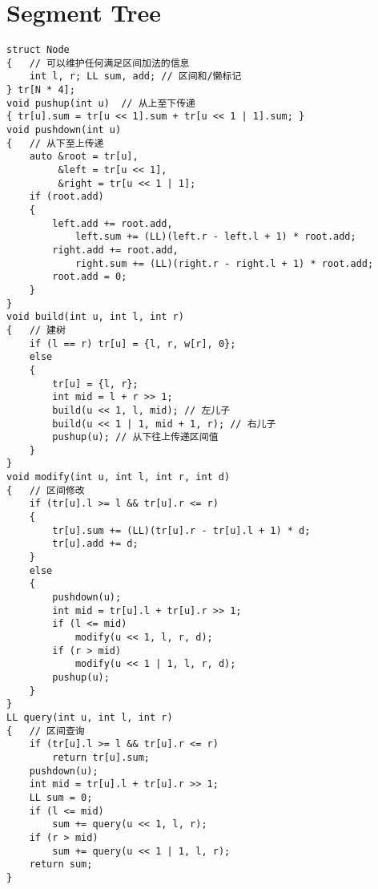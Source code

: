 \section{Segment Tree}
\begin{lstlisting}
struct Node
{   // 可以维护任何满足区间加法的信息
    int l, r; LL sum, add; // 区间和/懒标记
} tr[N * 4];
void pushup(int u)  // 从上至下传递
{ tr[u].sum = tr[u << 1].sum + tr[u << 1 | 1].sum; }
void pushdown(int u)
{   // 从下至上传递
    auto &root = tr[u],
         &left = tr[u << 1],
         &right = tr[u << 1 | 1];
    if (root.add)
    {
        left.add += root.add,
            left.sum += (LL)(left.r - left.l + 1) * root.add;
        right.add += root.add,
            right.sum += (LL)(right.r - right.l + 1) * root.add;
        root.add = 0;
    }
}
void build(int u, int l, int r)
{   // 建树
    if (l == r) tr[u] = {l, r, w[r], 0};
    else
    {
        tr[u] = {l, r};
        int mid = l + r >> 1;
        build(u << 1, l, mid); // 左儿子
        build(u << 1 | 1, mid + 1, r); // 右儿子
        pushup(u); // 从下往上传递区间值
    }
}
void modify(int u, int l, int r, int d)
{   // 区间修改
    if (tr[u].l >= l && tr[u].r <= r)
    {
        tr[u].sum += (LL)(tr[u].r - tr[u].l + 1) * d;
        tr[u].add += d;
    }
    else
    {
        pushdown(u);
        int mid = tr[u].l + tr[u].r >> 1;
        if (l <= mid)
            modify(u << 1, l, r, d);
        if (r > mid)
            modify(u << 1 | 1, l, r, d);
        pushup(u);
    }
}
LL query(int u, int l, int r)
{   // 区间查询
    if (tr[u].l >= l && tr[u].r <= r)
        return tr[u].sum;
    pushdown(u);
    int mid = tr[u].l + tr[u].r >> 1;
    LL sum = 0;
    if (l <= mid)
        sum += query(u << 1, l, r);
    if (r > mid)
        sum += query(u << 1 | 1, l, r);
    return sum;
}
\end{lstlisting}